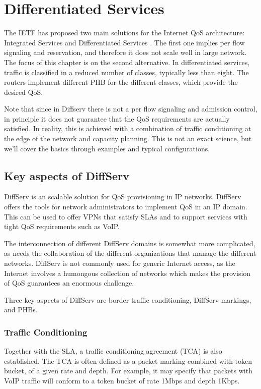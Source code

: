 \chapter{Differentiated Services}

The IETF has proposed two main solutions for the Internet QoS architecture: Integrated Services and Differentiated Services \cite{rfc2475}.
The first one implies per flow signaling and reservation, and therefore it does not scale well in large network.
The focus of this chapter is on the second alternative.
In differentiated services, traffic is classified in a reduced number of classes, typically less than eight.
The routers implement different PHB for the different classes, which provide the desired QoS.

Note that since in Diffserv there is not a per flow signaling and admission control, in principle it does not guarantee that the QoS requirements are actually satisfied.
In reality, this is achieved with a combination of traffic conditioning at the edge of the network and capacity planning.
This is not an exact science, but we'll cover the basics through examples and typical configurations.

\section{Key aspects of DiffServ}
DiffServ is an scalable solution for QoS provisioning in IP networks.
DiffServ offers the tools for network administrators to implement QoS in an IP domain.
This can be used to offer VPNs that satisfy SLAs and to support services with tight QoS requirements such as VoIP.

The interconnection of different DiffServ domains is somewhat more complicated, as needs the collaboration of the different organizations that manage the different networks.
DiffServ is not commonly used for generic Internet access, as the Internet involves a humongous collection of networks which makes the provision of QoS guarantees an enormous challenge.

Three key aspects of DiffServ are border traffic conditioning, DiffServ markings, and PHBs.

\subsection{Traffic Conditioning}

Together with the SLA, a traffic conditioning agreement (TCA) is also established.
The TCA is often defined as a packet marking combined with token bucket, of a given rate and depth.
For example, it may specify that packets with VoIP traffic will conform to a token bucket of rate 1Mbps and depth 1Kbps.

